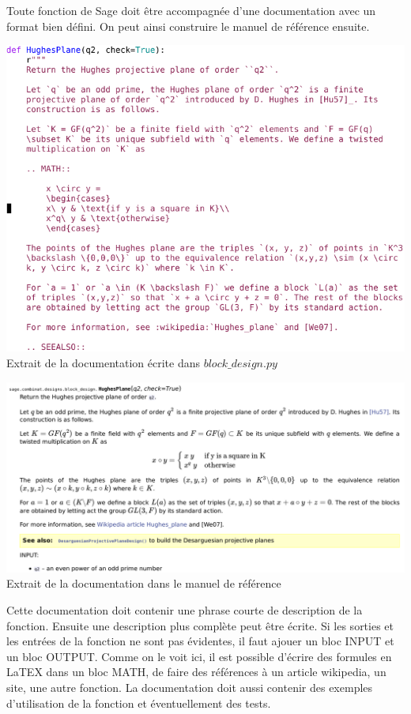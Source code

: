 \documentclass[a4paper]{article}
\begin{document}
\newpage
Toute fonction de Sage doit être accompagnée d'une documentation avec un format bien défini. On peut ainsi construire le manuel de référence ensuite.\\
\begin{center}
\includegraphics[scale=0.5]{hughesdoc.png}\\
  Extrait de la documentation écrite dans $block\_design.py$\vspace{1\baselineskip}

  \includegraphics[scale=0.5]{hughesdocmanual.png}
  Extrait de la documentation dans le manuel de référence
\end{center}
Cette documentation doit contenir une phrase courte de description de la fonction. Ensuite une description plus complète peut être écrite. Si les sorties et les entrées de la fonction ne sont pas évidentes, il faut ajouer un bloc INPUT et un bloc OUTPUT. Comme on le voit ici, il est possible d'écrire des formules en LaTEX dans un bloc MATH, de faire des références à un article wikipedia, un site, une autre fonction. La documentation doit aussi contenir des exemples d'utilisation de la fonction et éventuellement des tests.\\
\end{document}

